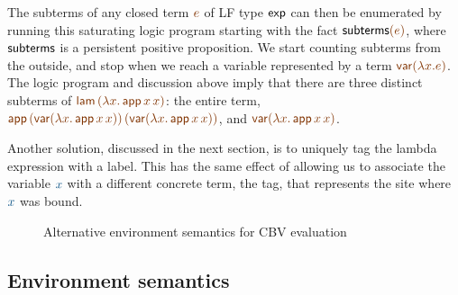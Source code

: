 The subterms of any closed term
$\lf{e}$ of LF type ${\sf exp}$ can then be enumerated by running this
saturating logic program starting with the fact ${\sf subterms}\lf{(e)}$,
where ${\sf subterms}$ is a persistent positive proposition.
We start counting subterms from the outside, and stop 
when we reach a variable represented by a term $\lf{{\sf
    var}(\lambda x.e)}$.  The logic program and discussion above imply
that there are three distinct subterms of $\lf{{\sf lam}\,(\lambda
  x.\,{\sf app}\,x\,x)}$: the entire term, $\lf{{\sf app}\,({\sf
    var}(\lambda x.\,{\sf app}\,x\,x))\,({\sf var}(\lambda x.\,{\sf
    app}\,x\,x))}$, and $\lf{{\sf var}(\lambda x.\,{\sf app}\,x\,x)}$.

Another solution, discussed in the next
section, is to uniquely tag the lambda expression with a label. This
has the same effect of allowing us to associate the variable $\obj{x}$
with a different concrete term, the tag, that represents the site
where $\obj{x}$ was bound.






\begin{figure}
\caption{Alternative environment semantics for CBV evaluation}
\label{fig:dest-env}
\end{figure}

\subsection{Environment semantics}



